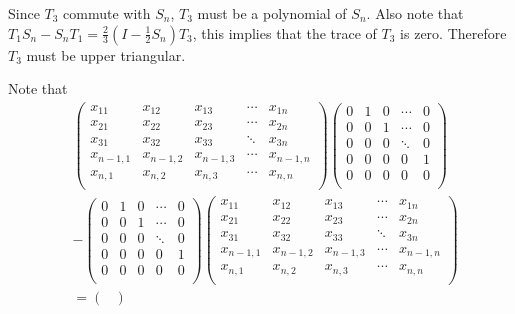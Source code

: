 \documentclass[a4paper,10pt]{amsart}
\begin{document}
Since $T_3$ commute with $S_n$, $T_3$ must be a polynomial of $S_n$.
Also note that $T_1 S_n - S_n T_1  =  \frac{2}{3} (I-\frac{1}{2}S_n)T_3$, this implies that the trace of $T_3$ is zero. Therefore $T_3$ must be upper triangular. 

Note that
\begin{align*}
    & \begin{pmatrix} 
       x_{11} & x_{12} & x_{13} & \cdots & x_{1n} \\
       x_{21} & x_{22} & x_{23} & \cdots & x_{2n}\\
       x_{31} & x_{32} & x_{33} & \ddots & x_{3n} \\
       x_{n-1,1} &  x_{n-1,2} &  x_{n-1,3} & \cdots & x_{n-1,n}  \\
       x_{n,1}  & x_{n,2}  & x_{n,3}  & \cdots & x_{n,n}   \\
    \end{pmatrix}      
    \begin{pmatrix} 
    0 & 1 & 0 & \cdots & 0 \\
    0 & 0 & 1 & \cdots & 0\\
    0 & 0 & 0 & \ddots & 0 \\
    0 & 0 & 0 & 0 & 1 \\
    0 & 0 & 0 & 0 & 0  \\
    \end{pmatrix}\\ 
    & -
    \begin{pmatrix} 
    0 & 1 & 0 & \cdots & 0 \\
    0 & 0 & 1 & \cdots & 0\\
    0 & 0 & 0 & \ddots & 0 \\
    0 & 0 & 0 & 0 & 1 \\
    0 & 0 & 0 & 0 & 0  \\
    \end{pmatrix}      
    \begin{pmatrix} 
       x_{11} & x_{12} & x_{13} & \cdots & x_{1n} \\
       x_{21} & x_{22} & x_{23} & \cdots & x_{2n}\\
       x_{31} & x_{32} & x_{33} & \ddots & x_{3n} \\
       x_{n-1,1} &  x_{n-1,2} &  x_{n-1,3} & \cdots & x_{n-1,n}  \\
       x_{n,1}  & x_{n,2}  & x_{n,3}  & \cdots & x_{n,n}   \\
    \end{pmatrix}\\
    & = 
    \begin{pmatrix} 

\end{pmatrix}
\end{align*}
\end{document}
